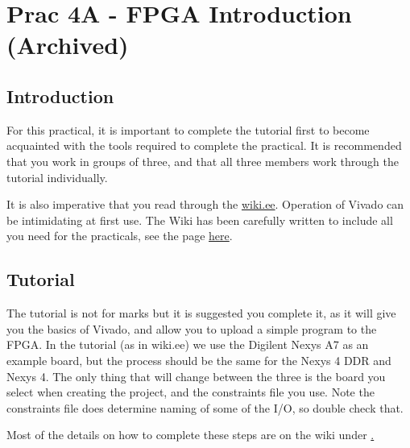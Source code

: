 \section{Prac 4A - FPGA Introduction (Archived)}
\label{sec:Prac4}
\subsection{Introduction}
For this practical, it is important to complete the tutorial first to become acquainted with the tools required to complete the practical. It is recommended that you work in groups of three, and that all three members work through the tutorial individually.

It is also imperative that you read through the \href{http://wiki.ee.uct.ac.za/Main_Page}{wiki.ee}. Operation of Vivado can be intimidating at first use. The Wiki has been carefully written to include all you need for the practicals, see the page \href{http://wiki.ee.uct.ac.za/Xilinx_Vivado}{here}. 

\subsection{Tutorial}
The tutorial is not for marks but it is suggested you complete it, as it will give you the basics of Vivado, and allow you to upload a simple program to the FPGA. In the tutorial (as in wiki.ee) we use the Digilent Nexys A7 as an example board, but the process should be the same for the Nexys 4 DDR and Nexys 4. The only thing that will change between the three is the board you select when creating the project, and the constraints file you use. Note the constraints file does determine naming of some of the I/O, so double check that.

Most of the details on how to complete these steps are on the wiki under \href{http://wiki.ee.uct.ac.za/Xilinx_Vivado}.

